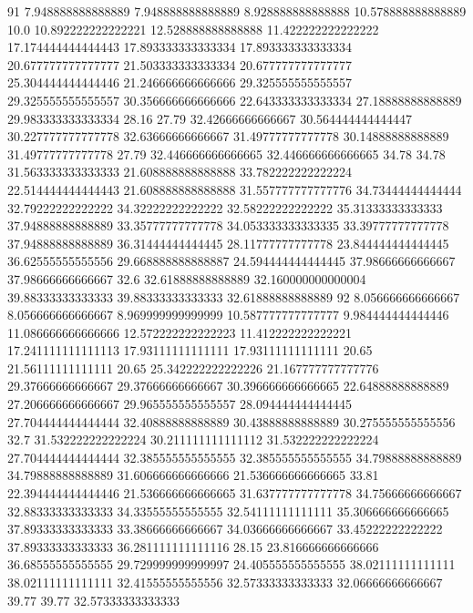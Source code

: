 91 7.948888888888889 7.948888888888889 8.928888888888888 10.578888888888889 10.0 10.892222222222221 12.528888888888888 11.422222222222222 17.174444444444443 17.893333333333334 17.893333333333334 20.677777777777777 21.503333333333334 20.677777777777777 25.304444444444446 21.246666666666666 29.325555555555557 29.325555555555557 30.356666666666666 22.643333333333334 27.18888888888889 29.983333333333334 28.16 27.79 32.42666666666667 30.564444444444447 30.227777777777778 32.63666666666667 31.49777777777778 30.14888888888889 31.49777777777778 27.79 32.446666666666665 32.446666666666665 34.78 34.78 31.563333333333333 21.608888888888888 33.782222222222224 22.514444444444443 21.608888888888888 31.557777777777776 34.73444444444444 32.79222222222222 34.32222222222222 32.58222222222222 35.31333333333333 37.94888888888889 33.35777777777778 34.053333333333335 33.39777777777778 37.94888888888889 36.31444444444445 28.11777777777778 23.844444444444445 36.62555555555556 29.668888888888887 24.594444444444445 37.98666666666667 37.98666666666667 32.6 32.61888888888889 32.160000000000004 39.88333333333333 39.88333333333333 32.61888888888889
92 8.056666666666667 8.056666666666667 8.969999999999999 10.587777777777777 9.984444444444446 11.086666666666666 12.572222222222223 11.412222222222221 17.241111111111113 17.93111111111111 17.93111111111111 20.65 21.56111111111111 20.65 25.342222222222226 21.167777777777776 29.37666666666667 29.37666666666667 30.396666666666665 22.64888888888889 27.206666666666667 29.965555555555557 28.094444444444445 27.704444444444444 32.40888888888889 30.43888888888889 30.275555555555556 32.7 31.532222222222224 30.211111111111112 31.532222222222224 27.704444444444444 32.385555555555555 32.385555555555555 34.79888888888889 34.79888888888889 31.606666666666666 21.536666666666665 33.81 22.394444444444446 21.536666666666665 31.637777777777778 34.75666666666667 32.88333333333333 34.33555555555555 32.54111111111111 35.306666666666665 37.89333333333333 33.38666666666667 34.03666666666667 33.45222222222222 37.89333333333333 36.281111111111116 28.15 23.816666666666666 36.68555555555555 29.729999999999997 24.405555555555555 38.02111111111111 38.02111111111111 32.41555555555556 32.57333333333333 32.06666666666667 39.77 39.77 32.57333333333333
